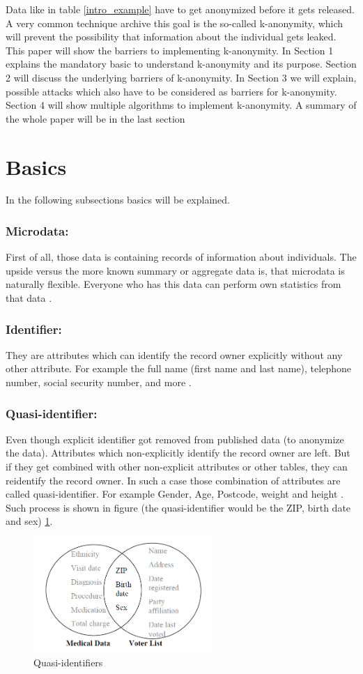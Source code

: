 \documentclass{llncs}
\begin{document}
Data like in table \ref{intro_example} have to get anonymized before it gets released. A very common
technique archive this goal is the so-called k-anonymity, which will prevent
the possibility that information about the individual gets leaked. This paper will
show the barriers to implementing k-anonymity. In Section
1 explains the mandatory basic to understand k-anonymity and its purpose.
Section 2 will discuss the underlying barriers of k-anonymity.
In Section 3 we will explain, possible attacks which also have to be considered as barriers for k-anonymity. Section 4 will show multiple algorithms to implement
k-anonymity. A summary of the whole paper will be in the last section
\newpage
\section{Basics}
In the following subsections basics will be explained. 
\subsubsection{Microdata:}
First of all, those data is containing records of information about individuals. The upside versus the more known summary or aggregate data is, that microdata is naturally flexible. Everyone who has this data can perform own statistics from that data \cite{microdataweb}.
\subsubsection{Identifier:}
They are attributes which can identify the record owner explicitly without any other attribute. For example the full name (first name and last name), telephone number, social security number, and more \cite{domingo2008critique}.
\subsubsection{Quasi-identifier:}
Even though explicit identifier got removed from published data (to anonymize the data). Attributes which non-explicitly identify the record owner are left. But if they get combined with other non-explicit attributes or other tables, they can reidentify the record owner. In such a case those combination of attributes are called quasi-identifier. For example Gender, Age, Postcode, weight and height \cite{dalenius1986finding}. Such process is shown in figure (the quasi-identifier would be the ZIP, birth date and sex) \ref{quasiidentifier}.
\begin{figure}[]
	\centering
	\includegraphics[width=0.6\textwidth]{linkingdata.png}
	\caption{Quasi-identifiers}%
	\label{quasiidentifier}
\end{figure}
\end{document}
